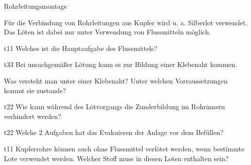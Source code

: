 \begin{aufgabe}[Technologie]{Rohrleitungsmontage}
   \begin{textonly}
       Für die Verbindung von Rohrleitungen aus Kupfer wird u. a. Silberlot
       verwendet. Das Löten ist dabei nur unter Verwendung von Flussmitteln
       möglich.
   \end{textonly}
   \begin{teilaufgabe}{t}{1}{1}
       Welches ist die Hauptaufgabe des Flussmittels?
   \end{teilaufgabe}
   \begin{loesung}
   \end{loesung}
   \begin{teilaufgabe}{t}{3}{3}
       Bei unsachgemäßer Lötung kann es zur Bildung einer \glqq Klebenaht\grqq{}
       kommen.
    
       Was versteht man unter einer \glqq Klebenaht\grqq? Unter welchen
       Vorraussetzungen kommt sie zustande?
   \end{teilaufgabe}
   \begin{loesung}
   \end{loesung}
   \begin{teilaufgabe}{t}{2}{2}
       Wie kann während des Lötvorgangs die Zunderbildung im Rohrinnern
       verhindert werden?
   \end{teilaufgabe}
   \begin{loesung}
   \end{loesung}
    \begin{teilaufgabe}{t}{2}{2}
       Welche 2 Aufgaben hat das Evakuieren der Anlage vor dem Befüllen?
   \end{teilaufgabe}
   \begin{loesung}
   \end{loesung}
   \begin{teilaufgabe}{t}{1}{1}
       Kupferrohre können auch ohne Flussmittel verlötet werden, wenn bestimmte
       Lote verwendet werden. Welcher Stoff muss in diesen Loten enthalten sein?
   \end{teilaufgabe}
   \begin{loesung}
   \end{loesung}
\end{aufgabe}



